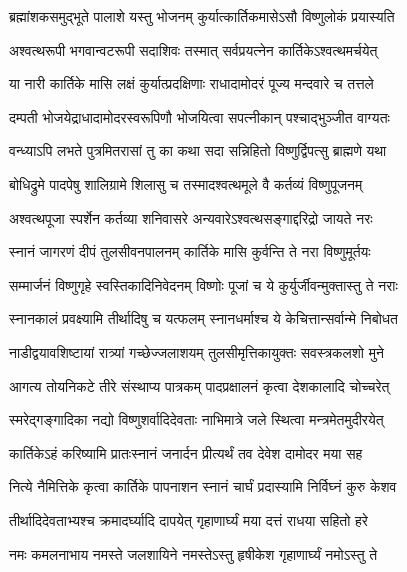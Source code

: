 \twolineshloka
{ब्रह्मांशकसमुद्भूते पालाशे यस्तु भोजनम्}
{कुर्यात्कार्तिकमासेऽसौ विष्णुलोकं प्रयास्यति} %

\twolineshloka
{अश्वत्थरूपी भगवान्वटरूपी सदाशिवः}
{तस्मात् सर्वप्रयत्नेन कार्तिकेऽश्वत्थमर्चयेत्} %

\twolineshloka
{या नारी कार्तिके मासि लक्षं कुर्यात्प्रदक्षिणाः}
{राधादामोदरं पूज्य मन्दवारे च तत्तले} %

\twolineshloka
{दम्पती भोजयेद्राधादामोदरस्वरूपिणौ}
{भोजयित्वा सपत्नीकान् पश्चाद्भुञ्जीत वाग्यतः} %

\twolineshloka
{वन्ध्याऽपि लभते पुत्रमितरासां तु का कथा}
{सदा सन्निहितो विष्णुर्द्विपत्सु ब्राह्मणे यथा} %

\twolineshloka
{बोधिद्रुमे पादपेषु शालिग्रामे शिलासु च}
{तस्मादश्वत्थमूले वै कर्तव्यं विष्णुपूजनम्} %

\twolineshloka
{अश्वत्थपूजा स्पर्शेन कर्तव्या शनिवासरे}
{अन्यवारेऽश्वत्थसङ्गाद्दरिद्रो जायते नरः} %

\twolineshloka
{स्नानं जागरणं दीपं तुलसीवनपालनम्}
{कार्तिके मासि कुर्वन्ति ते नरा विष्णुमूर्तयः} %

\twolineshloka
{सम्मार्जनं विष्णुगृहे स्वस्तिकादिनिवेदनम्}
{विष्णोः पूजां च ये कुर्युर्जीवन्मुक्तास्तु ते नराः} %

\twolineshloka
{स्नानकालं प्रवक्ष्यामि तीर्थादिषु च यत्फलम्}
{स्नानधर्माश्च ये केचित्तान्सर्वान्मे निबोधत} %






\twolineshloka
{नाडीद्वयावशिष्टायां रात्र्यां गच्छेज्जलाशयम्}
{तुलसीमृत्तिकायुक्तः सवस्त्रकलशो मुने} %

\twolineshloka
{आगत्य तोयनिकटे तीरे संस्थाप्य पात्रकम्}
{पादप्रक्षालनं कृत्वा देशकालादि चोच्चरेत्} %

\twolineshloka
{स्मरेद्गङ्गादिका नद्यो विष्णुशर्वादिदेवताः}
{नाभिमात्रे जले स्थित्वा मन्त्रमेतमुदीरयेत्} %

\twolineshloka
{कार्तिकेऽहं करिष्यामि प्रातःस्नानं जनार्दन}
{प्रीत्यर्थं तव देवेश दामोदर मया सह} %

\twolineshloka
{नित्ये नैमित्तिके कृत्वा कार्तिके पापनाशन}
{स्नानं चार्घं प्रदास्यामि निर्विघ्नं कुरु केशव} %

\twolineshloka
{तीर्थादिदेवताभ्यश्च क्रमादर्घ्यादि दापयेत्}
{गृहाणार्घ्यं मया दत्तं राधया सहितो हरे} %

\twolineshloka
{नमः कमलनाभाय नमस्ते जलशायिने}
{नमस्तेऽस्तु हृषीकेश गृहाणार्घ्यं नमोऽस्तु ते} %


